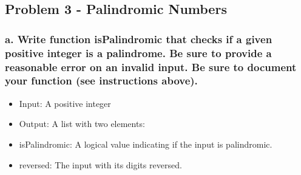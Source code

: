 \documentclass[
  letterpaper,
  DIV=11,
  numbers=noendperiod]{scrartcl}
\providecommand{\tightlist}{%
  \setlength{\itemsep}{0pt}\setlength{\parskip}{0pt}}\usepackage{longtable,booktabs,array}
\begin{document}
\subsection{Problem 3 - Palindromic
Numbers}\label{problem-3---palindromic-numbers}

\subsubsection{a. Write function isPalindromic that checks if a given
positive integer is a palindrome. Be sure to provide a reasonable error
on an invalid input. Be sure to document your function (see instructions
above).}\label{a.-write-function-ispalindromic-that-checks-if-a-given-positive-integer-is-a-palindrome.-be-sure-to-provide-a-reasonable-error-on-an-invalid-input.-be-sure-to-document-your-function-see-instructions-above.}

\begin{itemize}
\tightlist
\item
  Input: A positive integer
\item
  Output: A list with two elements:
\item
  isPalindromic: A logical value indicating if the input is palindromic.
\item
  reversed: The input with its digits reversed.
\end{itemize}
\end{document}
